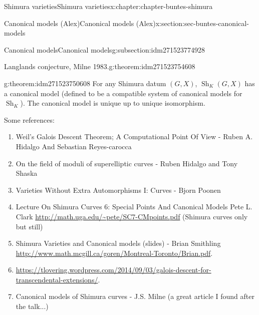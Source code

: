 \documentclass[oneside,10pt,]{book}
\numberwithin{equation}{section}
\begin{document}
\begin{chapterptx}{Shimura varieties}{}{Shimura varieties}{}{}{x:chapter:chapter-buntes-shimura}
\begin{sectionptx}{Canonical models (Alex)}{}{Canonical models (Alex)}{}{}{x:section:sec-buntes-canonical-models}
\begin{subsectionptx}{Canonical models}{}{Canonical models}{}{}{g:subsection:idm271523774928}
\begin{theorem}{Langlands conjecture, Milne 1983.}{}{g:theorem:idm271523754608}
\end{theorem}
\begin{theorem}{}{}{g:theorem:idm271523750608}%
For any Shimura datum \((G,X)\), \({\operatorname{Sh}}_K(G,X)\) has a canonical model (defined to be a compatible system of canonical models for \({\operatorname{Sh}}_K\)). The canonical model is unique up to unique isomorphism.%
\end{theorem}
Some references:%
\begin{enumerate}
\item{}Weil’s Galois Descent Theorem; A Computational Point Of View - Ruben A. Hidalgo And Sebastian Reyes-carocca%
\item{}On the field of moduli of superelliptic curves - Ruben Hidalgo and Tony Shaska%
\item{}Varieties Without Extra Automorphisms I: Curves - Bjorn Poonen%
\item{}Lecture On Shimura Curves 6: Special Points And Canonical Models Pete L. Clark \url{http://math.uga.edu/\~pete/SC7-CMpoints.pdf} (Shimura curves only but still)%
\item{}Shimura Varieties and Canonical models (slides) - Brian Smithling \url{http://www.math.mcgill.ca/goren/Montreal-Toronto/Brian.pdf}.%
\item{}\url{https://tlovering.wordpress.com/2014/09/03/galois-descent-for-transcendental-extensions/}.%
\item{}Canonical models of Shimura curves -  J.S. Milne (a great article I found after the talk...)%
\end{enumerate}
%
\end{subsectionptx}
\end{sectionptx}
\end{chapterptx}
%
%
\typeout{************************************************}
\typeout{************************************************}
%
\end{document}
